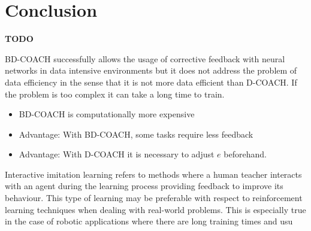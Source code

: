 \chapter{Conclusion}
\label{chapter:conclusion}

\textbf{TODO}



BD-COACH successfully allows the usage of corrective feedback with neural networks in data intensive environments but it does not address the problem of data efficiency in the sense that it is not more data efficient than D-COACH. If the problem is too complex it can take a long time to train.

\begin{itemize}
  \item BD-COACH is computationally more expensive
  \item Advantage: With BD-COACH, some tasks require less feedback
  \item Advantage: With D-COACH it is necessary to adjust $e$ beforehand.
\end{itemize}
Interactive imitation learning refers to methods where a human teacher interacts with an agent during the learning process providing feedback to improve its behaviour. This type of learning may be preferable with respect to reinforcement learning techniques when dealing with real-world problems. This is especially true in the case of robotic applications where there are long training times and usu

